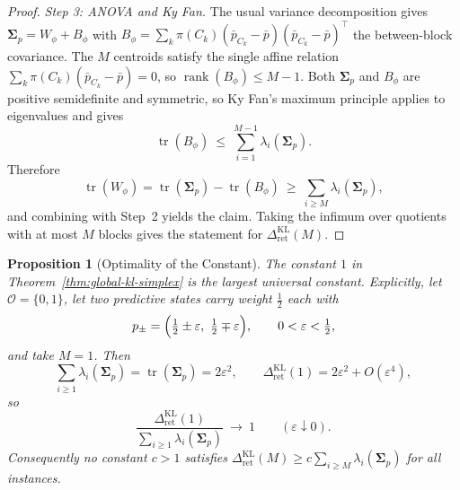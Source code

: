 \documentclass[12pt]{article}
\newtheorem{proposition}[theorem]{Proposition}
\theoremstyle{definition}
\DeclareMathOperator{\rank}{rank}
\DeclareMathOperator{\tr}{tr}
\newcommand{\RetKL}{\Delta_{\mathrm{ret}}^{\mathrm{KL}}}
\begin{document}
\begin{proof}
\emph{Step 3: ANOVA and Ky Fan.}
The usual variance decomposition gives $\bm{\Sigma}_p=W_\phi+B_\phi$ with
$B_\phi=\sum_k\pi(C_k)(\bar p_{C_k}-\bar p)(\bar p_{C_k}-\bar p)^{\!\top}$ the
between-block covariance.  The $M$ centroids satisfy the single affine relation
$\sum_k\pi(C_k)(\bar p_{C_k}-\bar p)=0$, so $\rank(B_\phi)\le M-1$.  Both
$\bm{\Sigma}_p$ and $B_\phi$ are positive semidefinite and symmetric, so Ky Fan's
maximum principle \cite{kyfan1951} applies to eigenvalues and gives
\[
\tr(B_\phi)\ \le\ \sum_{i=1}^{M-1}\lambda_i(\bm{\Sigma}_p).
\]
Therefore
\[
\tr(W_\phi)=\tr(\bm{\Sigma}_p)-\tr(B_\phi)\ \ge\ \sum_{i\ge M}\lambda_i(\bm{\Sigma}_p),
\]
and combining with Step~2 yields the claim.  Taking the infimum over quotients
with at most $M$ blocks gives the statement for $\RetKL(M)$.
\end{proof}

\begin{proposition}[Optimality of the Constant]
\label{prop:kl-simplex-sharp}
The constant $1$ in Theorem~\ref{thm:global-kl-simplex} is the largest
universal constant.  Explicitly, let $\mathcal O=\{0,1\}$, let two predictive
states carry weight $\tfrac12$ each with
\[
p_\pm=\Bigl(\tfrac12\pm\varepsilon,\ \tfrac12\mp\varepsilon\Bigr),
\qquad
0<\varepsilon<\tfrac12,
\]
and take $M=1$.  Then
\[
\sum_{i\ge1}\lambda_i(\bm{\Sigma}_p)=\tr(\bm{\Sigma}_p)=2\varepsilon^2,
\qquad
\RetKL(1)=2\varepsilon^2+O(\varepsilon^4),
\]
so
\[
\frac{\RetKL(1)}{\sum_{i\ge1}\lambda_i(\bm{\Sigma}_p)}
\ \longrightarrow\ 1
\qquad(\varepsilon\downarrow0).
\]
Consequently no constant $c>1$ satisfies
$\RetKL(M)\ge c\sum_{i\ge M}\lambda_i(\bm{\Sigma}_p)$ for all instances.
\end{proposition}
\end{document}
